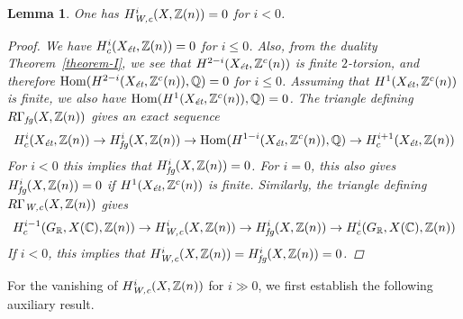 \documentclass[leqno,12pt]{article}
\theoremstyle{plain}
\newtheorem{lemma}[theorem]{\indent\sc Lemma}
\theoremstyle{definition}
\DeclareMathOperator{\Hom}{Hom}
\newcommand{\CC}{\mathbb{C}}
\newcommand{\QQ}{\mathbb{Q}}
\newcommand{\RR}{\mathbb{R}}
\newcommand{\ZZ}{\mathbb{Z}}
\newcommand{\Wc}{\text{\it W,c}}
\newcommand{\et}{\text{\it \'{e}t}}
\newcommand{\fg}{\text{\it fg}}
\begin{document}
\begin{lemma}
  One has $H^i_\Wc (X,\ZZ(n)) = 0$ for $i < 0$.

  \begin{proof}
    We have $H^i_c (X_\et, \ZZ(n)) = 0$ for $i \le 0$. Also, from the duality
    Theorem~\ref{theorem-I}, we see that $H^{2-i} (X_\et, \ZZ^c (n))$ is finite
    $2$-torsion, and therefore $\Hom (H^{2-i} (X_\et, \ZZ^c (n)), \QQ) = 0$ for
    $i \le 0$. Assuming that $H^1 (X_\et, \ZZ^c (n))$ is finite, we also have
    $\Hom (H^1 (X_\et, \ZZ^c (n)), \QQ) = 0$. The triangle defining
    $R\Gamma_\fg (X, \ZZ(n))$ gives an exact sequence
    \[ H^i_c (X_\et, \ZZ(n)) \to
      H^i_\fg (X, \ZZ(n)) \to
      \Hom (H^{1-i} (X_\et, \ZZ^c (n)), \QQ) \to
      H^{i+1}_c (X_\et, \ZZ(n)) \]
    For $i < 0$ this implies that $H^i_\fg (X, \ZZ(n)) = 0$.
    For $i = 0$, this also gives $H^i_\fg (X, \ZZ(n)) = 0$
    if $H^1 (X_\et, \ZZ^c (n))$ is finite.
    Similarly, the triangle defining $R\Gamma_\Wc (X, \ZZ(n))$ gives
    \[ H^{i-1}_c (G_\RR, X (\CC), \ZZ (n)) \to
      H^i_\Wc (X, \ZZ(n)) \to
      H^i_\fg (X, \ZZ(n)) \to
      H^i_c (G_\RR, X (\CC), \ZZ (n)) \]
    If $i < 0$, this implies that
    $H^i_\Wc (X, \ZZ(n)) = H^i_\fg (X, \ZZ(n)) = 0$.
  \end{proof}
\end{lemma}

For the vanishing of $H^i_\Wc (X, \ZZ(n))$ for $i \gg 0$, we first establish the
following auxiliary result.
\end{document}
